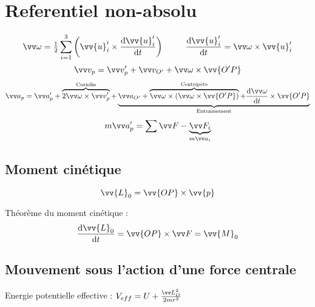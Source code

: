 \documentclass[../main.tex]{subfiles}
\begin{document}
\section{Referentiel non-absolu}
\[
  \vian=\tfrac{1}{2}\sum_{i=1}^{3}\left(\vv{u}_i'\times\dv{\vv{u}_i'}{t}\right) \phantom{thisis} \dv{\vv{u}_i'}{t}=\vian\times\vv{u}_i'
\]
\[
  \vi_p=\vi_p'+\vi_{O'} + \vian\times\vv{O'P}
\]
\[
  \ac_p = \ac_p' + \overbrace{2\vian\times\vi_p'}^{\text{Coriolis}} + \underbrace{\ac_{O'} + \overbrace{\vian\times(\vian\times\vv{O'P})}^{\text{Centripète}} + \dv{\vian}{t}\times\vv{O'P}}_{\text{Entrainement}}
\]
\[
  m\ac_p'=\sum\F - \underbrace{\F_i}_{m\ac_i}
\]

\subsection{Moment cinétique}
\[
  \vv{L}_0=\vv{OP}\times\vv{p}
\]

Théorème du moment cinétique :
\[
  \dv{\vv{L}_0}{t}=\vv{OP}\times\F=\vv{M}_0
\]


\subsection{Mouvement sous l'action d'une force centrale}
Energie potentielle effective : \(V_{eff}=U+\frac{\mc_O^2}{2mr^2}\)

\end{document}
